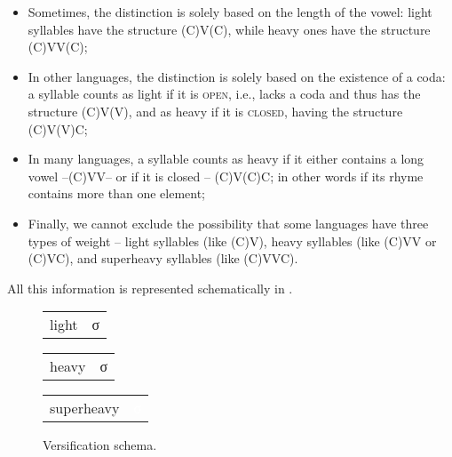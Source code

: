 \begin{refsection}
\begin{description}[labelwidth={\widthof{Step 3.}},leftmargin=!]
\begin{itemize}\sloppy
    \item Sometimes, the distinction is solely based on the length of the vowel: light syllables have the structure (C)V(C), while heavy ones have the structure (C)VV(C);
    \item In other languages, the distinction is solely based on the existence of a coda: a syllable counts as light if it is \textsc{open}, i.e., lacks a coda and thus has the structure (C)V(V), and as heavy if it is \textsc{closed}, having the structure (C)V(V)C;
    \item In many languages, a syllable counts as heavy if it either contains a long vowel --(C)VV-- or if it is closed -- (C)V(C)C; in other words if its rhyme contains more than one element;
    \item Finally, we cannot exclude the possibility that some languages have three types of weight – light syllables (like (C)V), heavy syllables (like (C)VV or (C)VC), and superheavy syllables (like (C)VVC).
    \end{itemize}
\end{description}

 All this information is represented schematically in .

\begin{figure}
\caption{Versification schema.}
\label{fig:versification}
\begin{center}

    \begin{multicols}{3}
        \begin{tabular}{c|c|}
        \cline{2-2}
             light &σ\\ \cline{2-2}
        \end{tabular}

        \begin{tabular}{c|c|}
        \cline{2-2}
             heavy & \cellcolor{lightgray}σ\\ \cline{2-2}
        \end{tabular}

        \begin{tabular}{c|c|}
        \cline{2-2}
             superheavy & \cellcolor{black} \textcolor{white}{σ} \\ \cline{2-2}
        \end{tabular}
    \end{multicols}
\end{center}


\end{figure}
\end{refsection}
